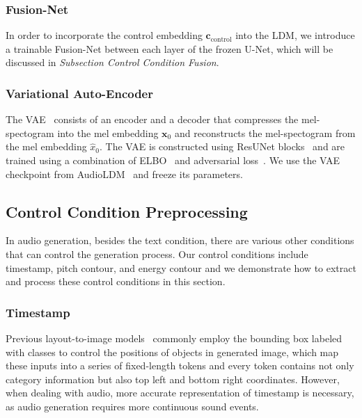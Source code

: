 \documentclass[letterpaper]{article} %
\begin{document}
\subsubsection{Fusion-Net} In order to incorporate the control embedding $\mathbf{c}_{\text{control}}$ into the LDM, we introduce a trainable Fusion-Net between each layer of the frozen U-Net, which will be discussed in \textit{Subsection Control Condition Fusion}.

\subsubsection{Variational Auto-Encoder} The VAE~\cite{kingma2013vae} consists of an encoder and a decoder that compresses the mel-spectogram into the mel embedding $\mathbf{x}_{0}$ and reconstructs the mel-spectogram from the mel embedding $\hat{x}_0$. The VAE is constructed using ResUNet blocks~\cite{kong2021decouplingma} and are trained using a combination of ELBO~\cite{kingma2013vae} and adversarial loss~\cite{isola2017itiadversarial}. We use the VAE checkpoint from AudioLDM~\cite{liu2023audioldm} and freeze its parameters.

\subsection{Control Condition Preprocessing}
\label{control condition preprocessing}

In audio generation, besides the text condition, there are various other conditions that can control the generation process. Our control conditions include timestamp, pitch contour, and energy contour and we demonstrate how to extract and process these control conditions in this section.

\subsubsection{Timestamp} Previous layout-to-image models~\cite{li2023gligen,jahn2021highresolutioncs,li2021lama} commonly employ the bounding box labeled with classes to control the positions of objects in generated image, which map these inputs into a series of fixed-length tokens and every token contains not only category information but also top left and bottom right coordinates. However, when dealing with audio, more accurate representation of timestamp is necessary, as audio generation requires more continuous sound events.
\end{document}
